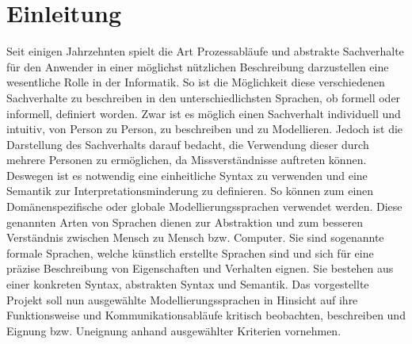 \chapter{Einleitung}
\label{ch:Einleitung}
Seit einigen Jahrzehnten spielt die Art Prozessabläufe und abstrakte Sachverhalte für den Anwender in einer möglichst nützlichen Beschreibung darzustellen eine wesentliche Rolle in der Informatik. So ist die Möglichkeit diese verschiedenen Sachverhalte zu beschreiben in den unterschiedlichsten Sprachen, ob formell oder informell, definiert worden. Zwar ist es möglich einen Sachverhalt individuell und intuitiv, von Person zu Person, zu beschreiben und zu Modellieren. Jedoch ist die Darstellung des Sachverhalts darauf bedacht, die Verwendung dieser durch mehrere Personen zu ermöglichen, da Missverständnisse auftreten können. Deswegen ist es notwendig eine einheitliche Syntax zu verwenden und eine Semantik zur Interpretationsminderung zu definieren. So können zum einen Domänenspezifische oder globale Modellierungssprachen verwendet werden. Diese genannten Arten von Sprachen dienen zur Abstraktion und zum besseren Verständnis zwischen Mensch zu Mensch bzw. Computer. Sie sind sogenannte formale Sprachen, welche künstlich erstellte Sprachen sind und sich für eine präzise Beschreibung von Eigenschaften und Verhalten eignen. Sie bestehen aus einer konkreten Syntax, abstrakten Syntax und Semantik. Das vorgestellte Projekt soll nun ausgewählte Modellierungssprachen in Hinsicht auf ihre Funktionsweise und  Kommunikationsabläufe kritisch beobachten, beschreiben und Eignung bzw. Uneignung anhand ausgewählter Kriterien vornehmen. 






